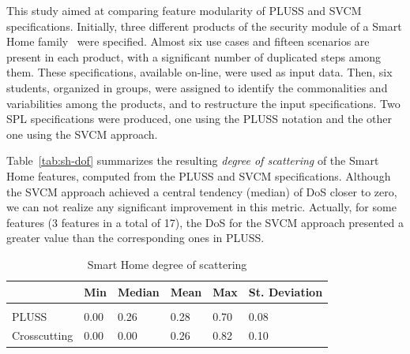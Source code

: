 \documentclass{acm_proc_article-sp}
\begin{document}
This study aimed at comparing feature modularity of PLUSS and SVCM specifications. Initially, three different products of the security module of a Smart Home family~\cite{Pohl:2005aa} were specified. Almost six use cases and fifteen scenarios are present in each product, with a significant number of duplicated steps among them. These specifications, available on-line, were used as input data. Then, six students, organized in groups, were assigned to identify the commonalities and variabilities among the products, and to restructure the input specifications. Two SPL specifications were produced, one using the PLUSS notation and the other one using the SVCM approach.




Table~\ref{tab:sh-dof} summarizes the resulting \emph{degree of scattering} of
the Smart Home features, computed from the PLUSS and SVCM specifications. Although the
SVCM approach achieved a central tendency (median) of DoS closer to
zero, we can not realize any significant improvement in this metric. Actually, for some
features (3 features in a total of 17), the DoS for the SVCM approach presented a greater value than the corresponding ones in PLUSS.

\begin{table}[htb]
\centering
\caption{Smart Home degree of scattering}
\label{tab:sh-dos}
\begin{small}
\begin{tabular}{llllll} \hline
					& Min 	& Median 	& Mean 	& Max 	& St. Deviation \\ \hline \\
	PLUSS			& 0.00  & 0.26   	& 0.28  & 0.70 	& 0.08 			\\
	Crosscutting	& 0.00  & 0.00  	& 0.26 	& 0.82 & 0.10  		\\ \hline	
\end{tabular}
\end{small}
\end{table}
\end{document}
